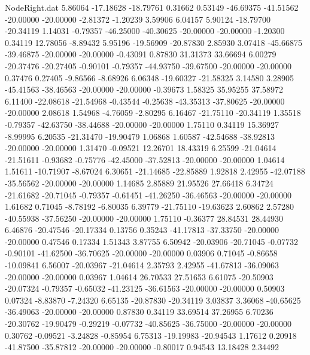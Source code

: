 \begin{filecontents}{NodeRight.dat}
   5.86064  -17.18628  -18.79761     0.31662    0.53149  -46.69375  -41.51562  -20.00000  -20.00000   -2.81372   -1.20239    3.59906    6.04157
   5.90124  -18.79700  -20.34119     1.14031   -0.79357  -46.25000  -40.30625  -20.00000  -20.00000   -1.20300    0.34119   12.78056   -8.89432
   5.95196  -19.56909  -20.87830     2.85930    3.07418  -45.66875  -39.46875  -20.00000  -20.00000   -0.43091    0.87830   31.31373   33.66694
   6.00279  -20.37476  -20.27405    -0.90101   -0.79357  -44.93750  -39.67500  -20.00000  -20.00000    0.37476    0.27405   -9.86566   -8.68926
   6.06348  -19.60327  -21.58325     3.14580    3.28905  -45.41563  -38.46563  -20.00000  -20.00000   -0.39673    1.58325   35.95255   37.58972
   6.11400  -22.08618  -21.54968    -0.43544   -0.25638  -43.35313  -37.80625  -20.00000  -20.00000    2.08618    1.54968   -4.76059   -2.80295
   6.16467  -21.75110  -20.34119     1.35518   -0.79357  -42.63750  -38.44688  -20.00000  -20.00000    1.75110    0.34119   15.36927   -8.99995
   6.20535  -21.31470  -19.90479     1.06868    1.60587  -42.54688  -38.92813  -20.00000  -20.00000    1.31470   -0.09521   12.26701   18.43319
   6.25599  -21.04614  -21.51611    -0.93682   -0.75776  -42.45000  -37.52813  -20.00000  -20.00000    1.04614    1.51611  -10.71907   -8.67024
   6.30651  -21.14685  -22.85889     1.92818    2.42955  -42.07188  -35.56562  -20.00000  -20.00000    1.14685    2.85889   21.95526   27.66418
   6.34724  -21.61682  -20.71045    -0.79357   -0.61451  -41.26250  -36.46563  -20.00000  -20.00000    1.61682    0.71045   -8.78192   -6.80035
   6.39779  -21.75110  -19.63623     2.60862    2.57280  -40.55938  -37.56250  -20.00000  -20.00000    1.75110   -0.36377   28.84531   28.44930
   6.46876  -20.47546  -20.17334     0.13756    0.35243  -41.17813  -37.33750  -20.00000  -20.00000    0.47546    0.17334    1.51343    3.87755
   6.50942  -20.03906  -20.71045    -0.07732   -0.90101  -41.62500  -36.70625  -20.00000  -20.00000    0.03906    0.71045   -0.86658  -10.09841
   6.56007  -20.03967  -21.04614     2.35793    2.42955  -41.67813  -36.09063  -20.00000  -20.00000    0.03967    1.04614   26.70533   27.51653
   6.61075  -20.50903  -20.07324    -0.79357   -0.65032  -41.23125  -36.61563  -20.00000  -20.00000    0.50903    0.07324   -8.83870   -7.24320
   6.65135  -20.87830  -20.34119     3.03837    3.36068  -40.65625  -36.49063  -20.00000  -20.00000    0.87830    0.34119   33.69514   37.26955
   6.70236  -20.30762  -19.90479    -0.29219   -0.07732  -40.85625  -36.75000  -20.00000  -20.00000    0.30762   -0.09521   -3.24828   -0.85954
   6.75313  -19.19983  -20.94543     1.17612    0.20918  -41.87500  -35.87812  -20.00000  -20.00000   -0.80017    0.94543   13.18428    2.34492

\end{filecontents}
